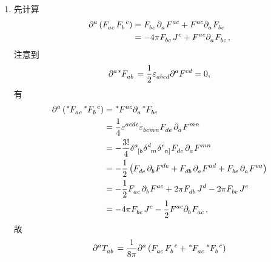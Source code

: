 \begin{xiti}
		\begin{zm}
			\begin{enumerate}[label=(\alph*)]
				\item 先计算
				\begin{equation*}
					\begin{split}
						\tensor{\partial}{^a} \left( \tensor{F}{_a_c} \tensor{F}{_b^c} \right) &= \tensor{F}{_b_c} \tensor{\partial}{_a} \tensor{F}{^a^c} + \tensor{F}{^a^c} \tensor{\partial}{_a} \tensor{F}{_b_c}\\
						&= - 4\pi \tensor{F}{_b_c} \tensor{J}{^c} + \tensor{F}{^a^c} \tensor{\partial}{_a} \tensor{F}{_b_c},
					\end{split}
				\end{equation*}
				注意到
				\begin{equation*}
					\tensor{\partial}{^a} \tensor[^*]{F}{_a_b} = \frac{1}{2} \tensor{\varepsilon}{_a_b_c_d} \tensor{\partial}{^a} \tensor{F}{^c^d} = 0,
				\end{equation*}
				有
				\begin{equation*}
					\begin{split}
						\tensor{\partial}{^a} \left( \tensor[^*]{F}{_a_c} \tensor[^*]{F}{_b^c} \right) &= \tensor[^*]{F}{^a^c} \tensor{\partial}{_a} \tensor[^*]{F}{_b_c}\\
						&= \frac{1}{4} \tensor{\varepsilon}{^a^c^d^e} \tensor{\varepsilon}{_b_c_m_n} \tensor{F}{_d_e} \tensor{\partial}{_a} \tensor{F}{^m^n}\\
						&= - \frac{3!}{4} \tensor{\delta}{^a_{[b}} \tensor{\delta}{^d_m} \tensor{\delta}{^e_{n]}} \tensor{F}{_d_e} \tensor{\partial}{_a} \tensor{F}{^m^n}\\
						&= - \frac{1}{2} \left( \tensor{F}{_d_e} \tensor{\partial}{_b} \tensor{F}{^d^e} + \tensor{F}{_d_b} \tensor{\partial}{_a} \tensor{F}{^a^d} + \tensor{F}{_b_e} \tensor{\partial}{_a} \tensor{F}{^e^a} \right)\\
						&= - \frac{1}{2} \tensor{F}{_a_c} \tensor{\partial}{_b} \tensor{F}{^a^c} + 2 \pi \tensor{F}{_d_b} \tensor{J}{^d} - 2\pi \tensor{F}{_b_e} \tensor{J}{^e}\\
						&= - 4 \pi \tensor{F}{_b_c} \tensor{J}{^c} - \frac{1}{2} \tensor{F}{^a^c} \tensor{\partial}{_b} \tensor{F}{_a_c},
					\end{split}
				\end{equation*}
				故
				\begin{equation*}
					\begin{split}
						\tensor{\partial}{^a} \tensor{T}{_a_b} &= \frac{1}{8\pi} \tensor{\partial}{^a} \left( \tensor{F}{_a_c} \tensor{F}{_b^c} + \tensor[^*]{F}{_a_c} \tensor[^*]{F}{_b^c} \right)\\

\end{split}
\end{equation*}
\end{enumerate}
\end{zm}
\end{xiti}
